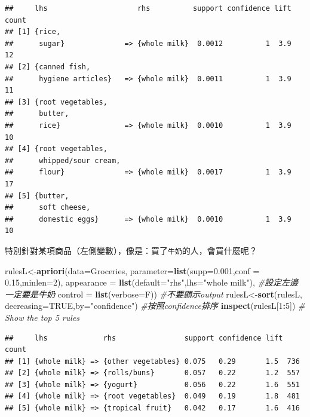 \documentclass[]{book}
\newenvironment{Shaded}{\begin{snugshade}}{\end{snugshade}}
\newcommand{\CommentTok}[1]{\textcolor[rgb]{0.56,0.35,0.01}{\textit{#1}}}
\newcommand{\DataTypeTok}[1]{\textcolor[rgb]{0.13,0.29,0.53}{#1}}
\newcommand{\DecValTok}[1]{\textcolor[rgb]{0.00,0.00,0.81}{#1}}
\newcommand{\FloatTok}[1]{\textcolor[rgb]{0.00,0.00,0.81}{#1}}
\newcommand{\KeywordTok}[1]{\textcolor[rgb]{0.13,0.29,0.53}{\textbf{#1}}}
\newcommand{\NormalTok}[1]{#1}
\newcommand{\OperatorTok}[1]{\textcolor[rgb]{0.81,0.36,0.00}{\textbf{#1}}}
\newcommand{\OtherTok}[1]{\textcolor[rgb]{0.56,0.35,0.01}{#1}}
\newcommand{\StringTok}[1]{\textcolor[rgb]{0.31,0.60,0.02}{#1}}
\begin{document}
\begin{verbatim}
##     lhs                     rhs          support confidence lift count
## [1] {rice,                                                            
##      sugar}              => {whole milk}  0.0012          1  3.9    12
## [2] {canned fish,                                                     
##      hygiene articles}   => {whole milk}  0.0011          1  3.9    11
## [3] {root vegetables,                                                 
##      butter,                                                          
##      rice}               => {whole milk}  0.0010          1  3.9    10
## [4] {root vegetables,                                                 
##      whipped/sour cream,                                              
##      flour}              => {whole milk}  0.0017          1  3.9    17
## [5] {butter,                                                          
##      soft cheese,                                                     
##      domestic eggs}      => {whole milk}  0.0010          1  3.9    10
\end{verbatim}

特別針對某項商品（左側變數），像是：買了\texttt{牛奶}的人，會買什麼呢？

\begin{Shaded}
\begin{Highlighting}[]
\NormalTok{rulesL<-}\KeywordTok{apriori}\NormalTok{(}\DataTypeTok{data=}\NormalTok{Groceries, }\DataTypeTok{parameter=}\KeywordTok{list}\NormalTok{(}\DataTypeTok{supp=}\FloatTok{0.001}\NormalTok{,}\DataTypeTok{conf =} \FloatTok{0.15}\NormalTok{,}\DataTypeTok{minlen=}\DecValTok{2}\NormalTok{),}
        \DataTypeTok{appearance =} \KeywordTok{list}\NormalTok{(}\DataTypeTok{default=}\StringTok{"rhs"}\NormalTok{,}\DataTypeTok{lhs=}\StringTok{"whole milk"}\NormalTok{), }\CommentTok{#設定左邊一定要是牛奶}
        \DataTypeTok{control =} \KeywordTok{list}\NormalTok{(}\DataTypeTok{verbose=}\NormalTok{F)) }\CommentTok{#不要顯示output}
\NormalTok{rulesL<-}\KeywordTok{sort}\NormalTok{(rulesL, }\DataTypeTok{decreasing=}\OtherTok{TRUE}\NormalTok{,}\DataTypeTok{by=}\StringTok{"confidence"}\NormalTok{) }\CommentTok{#按照confidence排序}
\KeywordTok{inspect}\NormalTok{(rulesL[}\DecValTok{1}\OperatorTok{:}\DecValTok{5}\NormalTok{]) }\CommentTok{# Show the top 5 rules}
\end{Highlighting}
\end{Shaded}

\begin{verbatim}
##     lhs             rhs                support confidence lift count
## [1] {whole milk} => {other vegetables} 0.075   0.29       1.5  736  
## [2] {whole milk} => {rolls/buns}       0.057   0.22       1.2  557  
## [3] {whole milk} => {yogurt}           0.056   0.22       1.6  551  
## [4] {whole milk} => {root vegetables}  0.049   0.19       1.8  481  
## [5] {whole milk} => {tropical fruit}   0.042   0.17       1.6  416
\end{verbatim}
\end{document}
